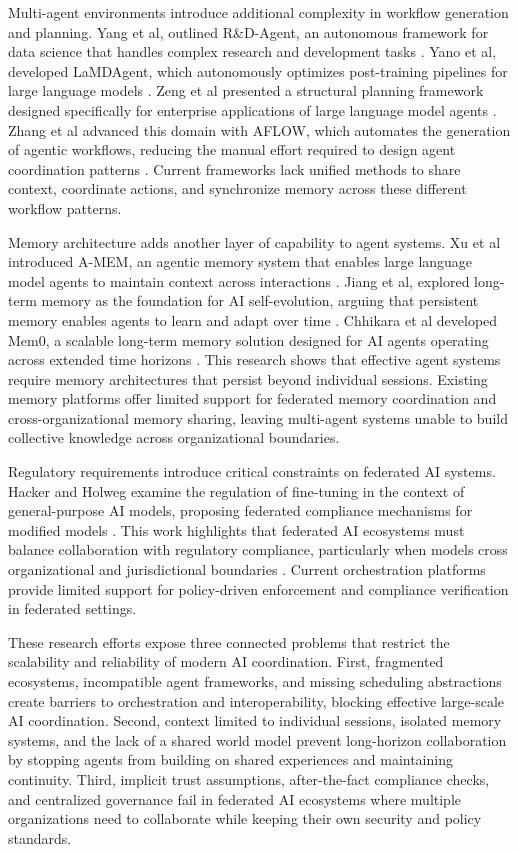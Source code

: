 \documentclass[final,5p,times,twocolumn,authoryear,draft]{elsarticle}
\begin{document}
Multi-agent environments introduce additional complexity in workflow generation and planning. Yang et al, outlined R\&D-Agent, an autonomous framework for data science that handles complex research and development tasks \cite{b8}. Yano et al, developed LaMDAgent, which autonomously optimizes post-training pipelines for large language models \cite{b9}. Zeng et al presented a structural planning framework designed specifically for enterprise applications of large language model agents \cite{b10}. Zhang et al advanced this domain with AFLOW, which automates the generation of agentic workflows, reducing the manual effort required to design agent coordination patterns \cite{b11}. Current frameworks lack unified methods to share context, coordinate actions, and synchronize memory across these different workflow patterns.

Memory architecture adds another layer of capability to agent systems. Xu et al introduced A-MEM, an agentic memory system that enables large language model agents to maintain context across interactions \cite{b12}. Jiang et al, explored long-term memory as the foundation for AI self-evolution, arguing that persistent memory enables agents to learn and adapt over time \cite{b13}. Chhikara et al developed Mem0, a scalable long-term memory solution designed for AI agents operating across extended time horizons \cite{b14}. This research shows that effective agent systems require memory architectures that persist beyond individual sessions. Existing memory platforms offer limited support for federated memory coordination and cross-organizational memory sharing, leaving multi-agent systems unable to build collective knowledge across organizational boundaries.

Regulatory requirements introduce critical constraints on federated AI systems. Hacker and Holweg examine the regulation of fine-tuning in the context of general-purpose AI models, proposing federated compliance mechanisms for modified models \cite{b8}. This work highlights that federated AI ecosystems must balance collaboration with regulatory compliance, particularly when models cross organizational and jurisdictional boundaries \cite{b9}. Current orchestration platforms provide limited support for policy-driven enforcement and compliance verification in federated settings.

These research efforts expose three connected problems that restrict the scalability and reliability of modern AI coordination. First, fragmented ecosystems, incompatible agent frameworks, and missing scheduling abstractions create barriers to orchestration and interoperability, blocking effective large-scale AI coordination. Second, context limited to individual sessions, isolated memory systems, and the lack of a shared world model prevent long-horizon collaboration by stopping agents from building on shared experiences and maintaining continuity. Third, implicit trust assumptions, after-the-fact compliance checks, and centralized governance fail in federated AI ecosystems where multiple organizations need to collaborate while keeping their own security and policy standards.
\end{document}
